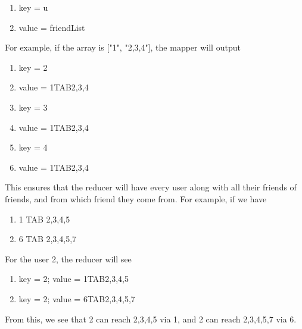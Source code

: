\documentclass[11pt]{article}
\begin{document}
\begin{justifying}
\begin{enumerate}
    \begin{enumerate}
        \item key \space\space  = u
        \item value             = friendList
    \end{enumerate}
    For example, if the array is ["1", "2,3,4"], the mapper will output
    \begin{enumerate}
        \item key \space\space  = 2
        \item value             = 1TAB2,3,4
        \item key \space\space  = 3
        \item value             = 1TAB2,3,4
        \item key \space\space  = 4
        \item value             = 1TAB2,3,4
    \end{enumerate}
    This ensures that the reducer will have every user along with all their friends of friends, and from which friend they come from. For example, if we have
    \begin{enumerate}
        \item 1 TAB 2,3,4,5
        \item 6 TAB 2,3,4,5,7
    \end{enumerate}
    For the user 2, the reducer will see
    \begin{enumerate}
        \item key = 2; value = 1TAB2,3,4,5
        \item key = 2; value = 6TAB2,3,4,5,7
    \end{enumerate}
    From this, we see that 2 can reach 2,3,4,5 via 1, and 2 can reach 2,3,4,5,7 via 6.
\end{enumerate}

\end{justifying}
\end{document}
